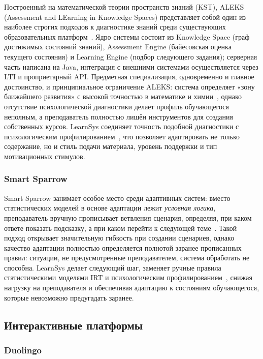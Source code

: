 Построенный на математической теории пространств знаний (KST),
ALEKS (Assessment and LEarning in Knowledge Spaces) представляет
собой один из наиболее строгих подходов к диагностике знаний
среди существующих образовательных
платформ~\cite{aleks2026official, vanlehn2006behavior}. Ядро
системы состоит из Knowledge Space (граф достижимых состояний
знаний), Assessment Engine (байесовская оценка текущего
состояния) и Learning Engine (подбор следующего задания);
серверная часть написана на Java, интеграция с внешними
системами осуществляется через LTI и проприетарный API.
Предметная специализация, одновременно и главное достоинство,
и принципиальное ограничение ALEKS: система определяет «зону
ближайшего развития» с высокой точностью в математике и
химии~\cite{aleks2026official}, однако отсутствие
психологической диагностики делает профиль обучающегося
неполным, а преподаватель полностью лишён инструментов для
создания собственных курсов. LearnSys соединяет точность
подобной диагностики с психологическим
профилированием~\cite{woolf2009building}, что позволяет
адаптировать не только содержание, но и стиль подачи
материала, уровень поддержки и тип мотивационных стимулов.

\subsubsection{Smart Sparrow}

Smart Sparrow занимает особое место среди адаптивных систем:
вместо статистических моделей в основе адаптации лежит
\textit{условная логика}, преподаватель вручную прописывает
ветвления сценария, определяя, при каком ответе показать
подсказку, а при каком перейти к следующей
теме~\cite{smartsparrow2026official, graf2007adaptive}.
Такой подход открывает значительную гибкость при создании
сценариев, однако качество адаптации полностью определяется
полнотой заранее прописанных правил: ситуации, не
предусмотренные преподавателем, система обработать не
способна. LearnSys делает следующий шаг, заменяет ручные
правила статистическими моделями IRT и психологическим
профилированием~\cite{brusilovsky2001adaptive}, снижая
нагрузку на преподавателя и обеспечивая адаптацию к
состояниям обучающегося, которые невозможно предугадать
заранее.

\subsection{Интерактивные платформы}

\subsubsection{Duolingo}

